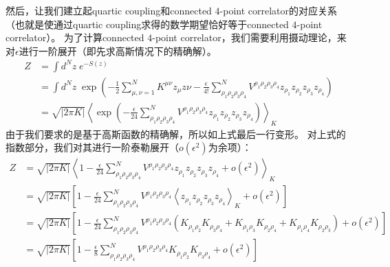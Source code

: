然后，让我们建立起quartic coupling和connected $4$-point correlator的对应关系（也就是使通过quartic coupling求得的数学期望恰好等于connected $4$-point correlator）。
为了计算connected $4$-point correlator，我们需要利用摄动理论，来对$\epsilon$进行一阶展开（即先求高斯情况下的精确解）。
\begin{equation}
    \begin{split}
        Z & = \int d^N\!z\;e^{-S(z)} \\
        & = \int d^N\!z\; \exp \left(
            -\frac{1}{2} \sum_{\mu,\nu=1}^N K^{\mu\nu}z_\mu z\nu -
            \frac{\epsilon}{4!}\sum_{\rho_1\rho_2\rho_3\rho_4}^N
            V^{\rho_1\rho_2\rho_3\rho_4}z_{\rho_1}z_{\rho_2}z_{\rho_3}z_{\rho_4}
        \right) \\
        & = \sqrt{|2\pi K|} \left<\exp\left(
            - \frac{\epsilon}{24}\sum_{\rho_1\rho_2\rho_3\rho_4}^N
            V^{\rho_1\rho_2\rho_3\rho_4}z_{\rho_1}z_{\rho_2}z_{\rho_3}z_{\rho_4}
        \right)\right>_K
    \end{split}
\end{equation}
由于我们要求的是基于高斯函数的精确解，所以如上式最后一行变形。
对上式的指数部分，我们对其进行一阶泰勒展开（$o(\epsilon^2)$为余项）：
\begin{equation}
    \begin{split}
        Z 
        & = \sqrt{|2\pi K|} \left<
            1 - \frac{\epsilon}{24}\sum_{\rho_1\rho_2\rho_3\rho_4}^N
            V^{\rho_1\rho_2\rho_3\rho_4}z_{\rho_1}z_{\rho_2}z_{\rho_3}z_{\rho_4} + o(\epsilon^2)
        \right>_K \\
        & = \sqrt{|2\pi K|} \left[
            1 - \frac{\epsilon}{24}\sum_{\rho_1\rho_2\rho_3\rho_4}^N
            V^{\rho_1\rho_2\rho_3\rho_4}
            \left<z_{\rho_1}z_{\rho_2}z_{\rho_3}z_{\rho_4}\right>_K
            + o(\epsilon^2)
        \right] \\
        & = \sqrt{|2\pi K|} \left[
            1 - \frac{\epsilon}{24}\sum_{\rho_1\rho_2\rho_3\rho_4}^N
            V^{\rho_1\rho_2\rho_3\rho_4}
            \left(
                K_{\rho_1\rho_2}K_{\rho_3\rho_4} + 
                K_{\rho_1\rho_3}K_{\rho_2\rho_4} +
                K_{\rho_1\rho_4}K_{\rho_2\rho_3}
            \right)
            + o(\epsilon^2)
        \right] \\
        & = \sqrt{|2\pi K|} \left[
            1 - \frac{\epsilon}{8}\sum_{\rho_1\rho_2\rho_3\rho_4}^N
            V^{\rho_1\rho_2\rho_3\rho_4}
            K_{\rho_1\rho_2}K_{\rho_3\rho_4}
            + o(\epsilon^2)
        \right] \\
    \end{split}
\end{equation}
